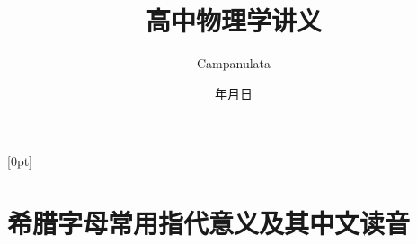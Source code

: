 \documentclass[cn,11pt,answer,founder]{elegantbook}
\title{高中物理学讲义}
\author{Campanulata}
\date{{\the\year}年{\the\month}月{\the\day}日}
\begin{document}
[0pt]{\addvspace{1.5pt}\filright\bf}{}{}{\contentspage}
\maketitle
\frontmatter

\tableofcontents
\mainmatter















\nocite{*} 
\appendix

\chapter{希腊字母常用指代意义及其中文读音}
\end{document}
